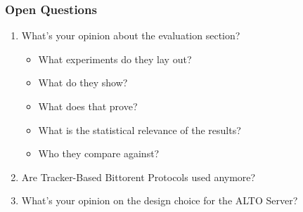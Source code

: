 \documentclass[10pt,    %
    english,            %
    xcolor=table,       %
    envcountsect,        %
    aspectratio=169     %
]{beamer}
\begin{document}
\begin{frame}
    \frametitle{Open Questions}

    \begin{enumerate}
        \item What's your opinion about the evaluation section?
        \begin{itemize}
            \item What experiments do they lay out?
            \item What do they show?
            \item What does that prove?
            \item What is the statistical relevance of the results?
            \item Who they compare against?
        \end{itemize}
        \item Are Tracker-Based Bittorent Protocols used anymore?
        \item What's your opinion on the design choice for the ALTO Server?
    \end{enumerate}

\end{frame}
\end{document}
